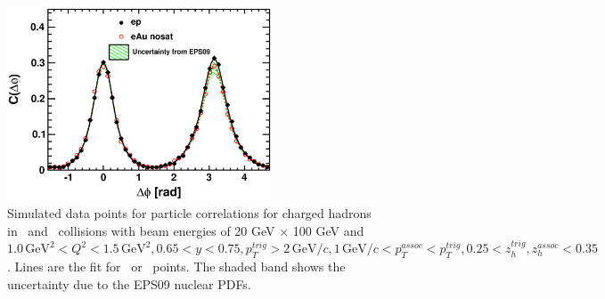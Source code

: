 \begin{figure}
\begin{center}
\includegraphics[width=0.7\textwidth]
{plots/chpt6/20x100_epAndeAu_Q2_1_y_0.7_uncertainty_EPS09_withfit.eps} 
\end{center} 
\caption[Monte Carlo result of diahdron correlation]{Simulated data points for particle correlations
for charged hadrons in \ep\ and \eAu\ collisions with beam energies of 20 GeV $\times$ 100
GeV and $1.0 \, \mathrm{GeV}^{2}  < Q^{2} < 1.5 \, \mathrm{GeV}^{2} , 0.65 < y < 0.75, p_{T}^{trig} > 2 \, \mathrm{GeV/}c, 1
\, \mathrm{GeV/}c < p_{T}^{assoc} < p_{T}^{trig}, 0.25 < z_{h}^{trig}, z_{h}^{assoc} <
0.35$. Lines are the fit for \ep\ or \eA\ points. The shaded band shows the uncertainty due to the EPS09 nuclear PDFs.
\label{fig:dihadron_base}}
\end{figure}

